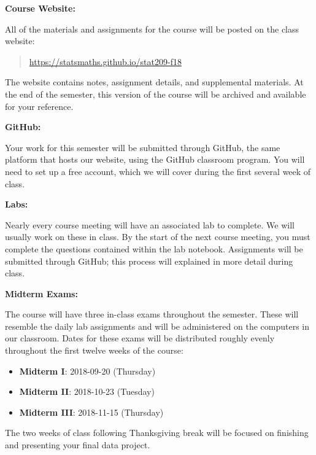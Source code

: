 \documentclass[12pt]{article}
\begin{document}
\bigskip

\textbf{Course Website:} \vspace{6pt}

All of the materials and assignments for the course will be posted
on the class website:
\begin{quote}
\url{https://statsmaths.github.io/stat209-f18}
\end{quote}
The website contains notes, assignment details, and
supplemental materials. At the end of the semester, this version of
the course will be archived and available for your reference.

\vspace{0.4cm}

\textbf{GitHub:} \vspace{6pt}

Your work for this semester will be submitted through GitHub,
the same platform that hosts our website, using the GitHub
classroom program. You will need to set up a free account, which
we will cover during the first several week of class.

\newpage

\textbf{Labs:} \vspace{6pt}

Nearly every course meeting will have an associated lab to complete. We will
usually work on these in class. By the start of the next course meeting, you
must complete the questions contained within the lab notebook. Assignments
will be submitted through GitHub; this process will explained in more detail
during class. \\

\bigskip

\textbf{Midterm Exams:} \vspace{6pt}

The course will have three in-class exams throughout the semester. These will
resemble the daily lab assignments and will be administered on the computers
in our classroom. Dates for these exams will be distributed roughly evenly
throughout the first twelve weeks of the course:
\begin{itemize}\setlength\itemsep{0em}
\item \textbf{Midterm I}: 2018-09-20 (Thursday)
\item \textbf{Midterm II}: 2018-10-23 (Tuesday)
\item \textbf{Midterm III}: 2018-11-15 (Thursday)
\end{itemize}
The two weeks of class following Thanksgiving break will be focused on
finishing and presenting your final data project.\\
\end{document}
